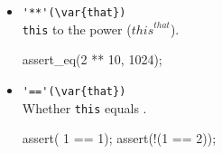 \begin{itemize}
\item \lstinline|'**'(\var{that})|\\
  \lstinline|this| to the  power (${this}^{that}$).
\begin{urbiscript}[firstnumber=last]
assert_eq(2 ** 10, 1024);
\end{urbiscript}

\item \lstinline|'=='(\var{that})|\\
  Whether \lstinline|this| equals .
\begin{urbiscript}[firstnumber=last]
assert(  1 == 1);
assert(!(1 == 2));
\end{urbiscript}
\end{itemize}


